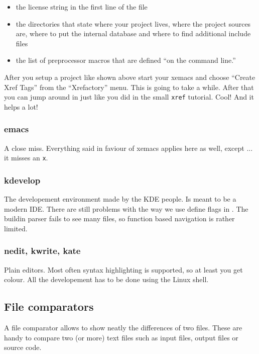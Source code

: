 \begin{itemize}
\item the license string in the first line of the file
\item the directories that state where your project lives, where the project
sources are, where to put the internal database and where to find
additional include files
\item the list of preprocessor macros that are defined {}``on the command
line.''
\end{itemize}
After you setup a project like shown above start your xemacs and choose
{}``Create Xref Tags'' from the {}``Xrefactory'' menu. This is
going to take a while. After that you can jump around in \ccarat{}
just like you did in the small \texttt{xref} tutorial. Cool! And it
helps a lot!


\subsubsection{emacs}

A close miss. Everything said in faviour of xemacs applies here as
well, except ... it misses an \texttt{x}.


\subsubsection{kdevelop}

The developement environment made by the KDE people. Is meant to be
a modern IDE. There are still problems with the way we use define
flags in \ccarat{}. The buildin parser fails to see many files, so
function based navigation is rather limited.


\subsubsection{nedit, kwrite, kate}

Plain editors. Most often syntax highlighting is supported, so at
least you get colour. All the developement has to be done using the
Linux shell.


\subsection{File comparators}

A file comparator allows to show neatly the differences of two files. These
are handy to compare two (or more) text files such as input files, output
files or source code.

